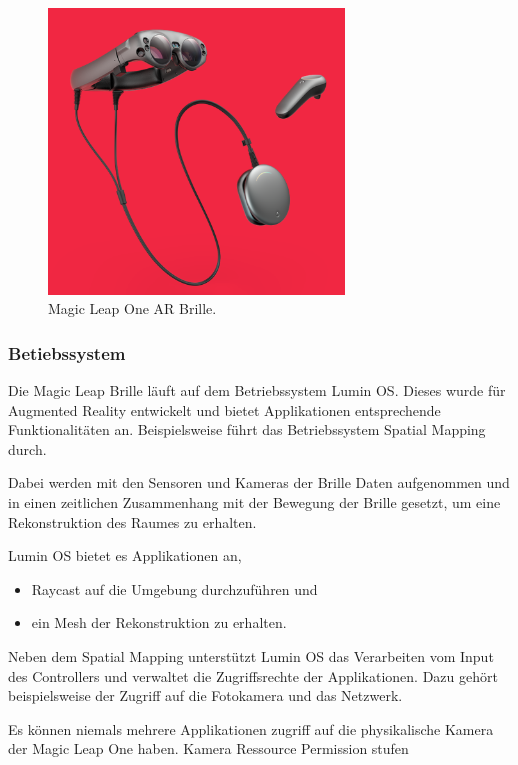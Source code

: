 \begin{figure}[H]
	\centering
	\includegraphics[width=0.7\textwidth]{images/img_magicLeap.PNG}
	\caption[]{Magic Leap One AR Brille.\citep{mlImage}}
	\label{viewManagement}
\end{figure}

\subsubsection{Betiebssystem}
Die Magic Leap Brille läuft auf dem Betriebssystem Lumin OS. Dieses wurde für Augmented Reality entwickelt und bietet Applikationen entsprechende Funktionalitäten an. Beispielsweise führt das Betriebssystem Spatial Mapping durch.\citep{mlluminOS,mlluminfeatures}

Dabei werden mit den Sensoren und Kameras der Brille Daten aufgenommen und in einen zeitlichen Zusammenhang mit der Bewegung der Brille gesetzt, um eine Rekonstruktion des Raumes zu erhalten.\citep{mlluminOS,mlluminfeatures,mlluminworldreconstruktion,mlmeshingunity}

Lumin OS bietet es Applikationen an,
\begin{itemize}
	\item Raycast auf die Umgebung durchzuführen und
	\item ein Mesh der Rekonstruktion zu erhalten.
\end{itemize}
Neben dem Spatial Mapping unterstützt Lumin OS das Verarbeiten vom Input des Controllers und verwaltet die Zugriffsrechte der Applikationen. Dazu gehört beispielsweise der Zugriff auf die Fotokamera und das Netzwerk.\citep{mlluminfeatures,mlappsecurity}

Es können niemals mehrere Applikationen zugriff auf die physikalische Kamera der Magic Leap One haben. Kamera Ressource
Permission stufen


